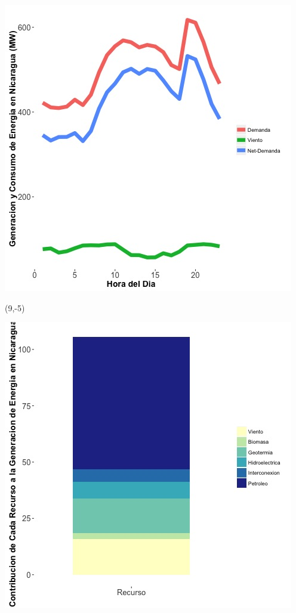 \documentclass{article}\usepackage[]{graphicx}\usepackage[]{color}
\newenvironment{knitrout}{}{} %
\begin{document}
 \vspace{20cm}


\begin{knitrout}
\color{fgcolor}
\includegraphics[scale=0.65]{figure/gridplot1.jpg} 
\end{knitrout}

 \begin{textblock}{1}(9,-5)
\begin{minipage}{20em}
\begingroup

\endgroup
\end{minipage}
\end{textblock}

 \vspace{2cm}

\begin{knitrout}
\color{fgcolor}
\includegraphics[scale=0.65]{figure/gridplot2.jpg} 
\end{knitrout}
\end{document}
